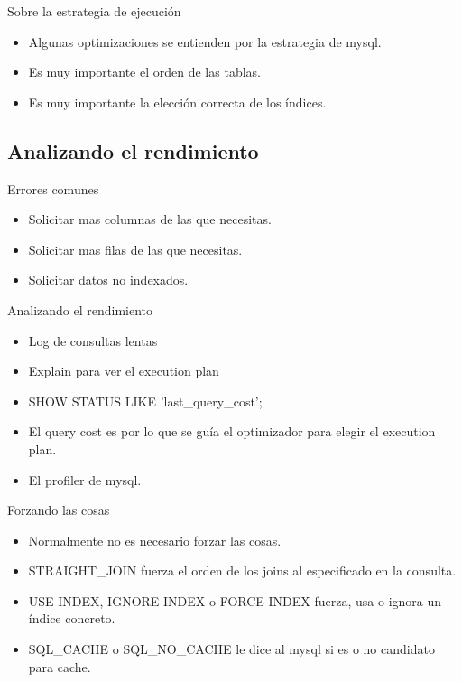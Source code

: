 \begin{frame}{Sobre la estrategia de ejecución}
  \begin{itemize}
    \item Algunas optimizaciones se entienden por la estrategia de mysql.
    \item Es muy importante el orden de las tablas.
    \item Es muy importante la elección correcta de los índices.
  \end{itemize}
\end{frame}

\subsection{Analizando el rendimiento}
\begin{frame}{Errores comunes}
  \begin{itemize}
    \item Solicitar mas columnas de las que necesitas.
    \item Solicitar mas filas de las que necesitas.
    \item Solicitar datos no indexados.
  \end{itemize}
\end{frame}

\begin{frame}{Analizando el rendimiento}
  \begin{itemize}
    \item Log de consultas lentas
    \item Explain para ver el execution plan
    \item SHOW STATUS LIKE 'last\_query\_cost';
    \item El query cost es por lo que se guía el optimizador para elegir el execution plan.
    \item El profiler de mysql.
  \end{itemize}
\end{frame}

\begin{frame}{Forzando las cosas}
  \begin{itemize}
    \item Normalmente no es necesario forzar las cosas.
    \item STRAIGHT\_JOIN fuerza el orden de los joins al especificado en la consulta.
    \item USE INDEX, IGNORE INDEX o FORCE INDEX fuerza, usa o ignora un índice concreto.
    \item SQL\_CACHE o SQL\_NO\_CACHE le dice al mysql si es o no candidato para cache.
  \end{itemize}
\end{frame}
